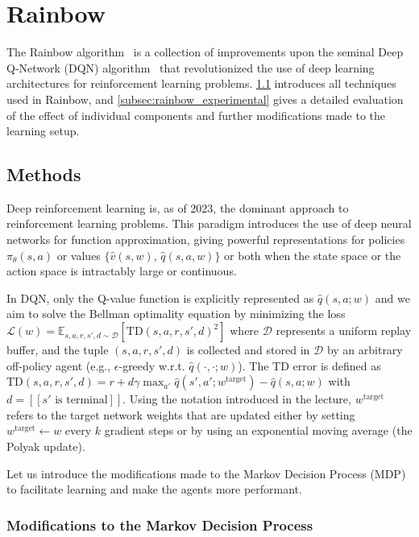 \section{Rainbow}

The Rainbow algorithm~\cite{Hessel2018:Rainbow} is a collection of improvements upon the seminal Deep Q-Network (DQN) algorithm~\cite{mnih2015humanlevel} that revolutionized the use of deep learning architectures for reinforcement learning problems. \ref{subsec:rainbow_methods} introduces all techniques used in Rainbow, and \ref{subsec:rainbow_experimental} gives a detailed evaluation of the effect of individual components and further modifications made to the learning setup.

\subsection{Methods}\label{subsec:rainbow_methods}

Deep reinforcement learning is, as of 2023, the dominant approach to reinforcement learning problems. This paradigm introduces the use of deep neural networks for function approximation, giving powerful representations for policies $\pi_\theta(s, a)$ or values $\{\hat{v}(s, w)$, $\hat{q}(s, a, w)\}$ or both when the state space or the action space is intractably large or continuous.

In DQN, only the Q-value function is explicitly represented as $\hat{q}(s, a; w)$ and we aim to solve the Bellman optimality equation by minimizing the loss $\mathcal{L}(w) = \mathbb{E}_{s, a, r, s', d \sim \mathcal{D}}\left[\text{TD}(s, a, r, s', d)^2\right]$ where $\mathcal{D}$ represents a uniform replay buffer, and the tuple $(s, a, r, s', d)$ is collected and stored in $\mathcal{D}$ by an arbitrary off-policy agent (e.g., $\epsilon$-greedy w.r.t. $\hat{q}(\cdot, \cdot; w)$). The TD error is defined as $\text{TD}(s, a, r, s', d) = r + d\gamma \max_{a'} \hat{q}\left(s', a'; w^\text{target}\right) - \hat{q}(s, a; w)$ with $d = [\![ s' \text{ is terminal} ]\!]$. Using the notation introduced in the lecture, $w^\text{target}$ refers to the target network weights that are updated either by setting $w^\text{target} \gets w$ every $k$ gradient steps or by using an exponential moving average (the Polyak update).

Let us introduce the modifications made to the Markov Decision Process (MDP) to facilitate learning and make the agents more performant.

\subsubsection{Modifications to the Markov Decision Process}\label{subsubsec:mdp}

